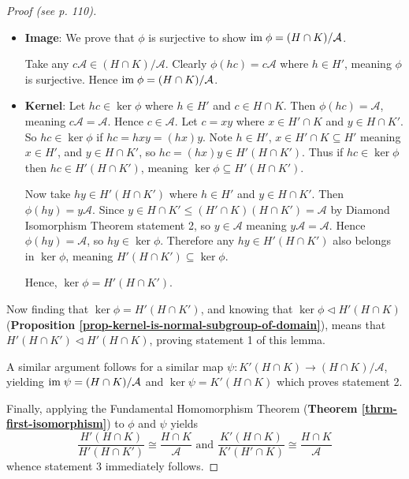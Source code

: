 \begin{proof}[Proof (see \cite{hungerford_1980} p. 110)]
\begin{itemize}
        \item \textbf{Image}: We prove that $\phi$ is surjective to show $\mathrm{im}\; \phi = (H\cap K)/\mathcal{A}$.
        
        Take any $c\mathcal{A} \in (H\cap K) / \mathcal{A}$. Clearly $\phi(hc) = c\mathcal{A}$ where $h \in H'$, meaning $\phi$ is surjective. Hence $\mathrm{im}\; \phi = (H\cap K)/\mathcal{A}$.
        
        \item \textbf{Kernel}: Let $hc \in \ker\phi$ where $h \in H'$ and $c \in H \cap K$. Then $\phi(hc) = \mathcal{A}$, meaning $c\mathcal{A} = \mathcal{A}$. Hence $c \in \mathcal{A}$. Let $c = xy$ where $x \in H'\cap K$ and $y \in H \cap K'$. So $hc \in \ker\phi$ if $hc = hxy = (hx)y$. Note $h \in H'$, $x \in H' \cap K \subseteq H'$ meaning $x \in H'$, and $y \in H \cap K'$, so $hc = (hx)y \in H'(H \cap K')$. Thus if $hc \in \ker\phi$ then $hc \in H'(H \cap K')$, meaning $\ker\phi \subseteq H'(H \cap K')$.
        
        Now take $hy \in H'(H \cap K')$ where $h \in H'$ and $y \in H \cap K'$. Then $\phi(hy) = y\mathcal{A}$. Since $y \in H \cap K' \leq (H' \cap K)(H \cap K') = \mathcal{A}$ by Diamond Isomorphism Theorem statement 2, so $y \in \mathcal{A}$ meaning $y\mathcal{A} = \mathcal{A}$. Hence $\phi(hy) = \mathcal{A}$, so $hy \in \ker\phi$. Therefore any $hy \in H'(H \cap K')$ also belongs in $\ker\phi$, meaning $H'(H \cap K') \subseteq \ker\phi$.
        
        Hence, $\ker\phi = H'(H \cap K')$.
    \end{itemize}
    
    Now finding that $\ker\phi = H'(H \cap K')$, and knowing that $\ker\phi \lhd H'(H\cap K)$ (\textbf{Proposition \ref{prop-kernel-is-normal-subgroup-of-domain}}), means that $H'(H \cap K') \lhd H'(H\cap K)$, proving statement 1 of this lemma.
    
    A similar argument follows for a similar map $\psi: K'(H\cap K) \to (H\cap K)/\mathcal{A}$, yielding $\mathrm{im}\;\psi = (H\cap K)/\mathcal{A}$ and $\ker\psi = K'(H\cap K)$ which proves statement 2.
    
    Finally, applying the Fundamental Homomorphism Theorem (\textbf{Theorem \ref{thrm-first-isomorphism}}) to $\phi$ and $\psi$ yields
    \[
        \frac{H'(H\cap K)}{H'(H\cap K')} \cong \frac{H\cap K}{\mathcal{A}} \text{ and } \frac{K'(H\cap K)}{K'(H'\cap K)} \cong \frac{H\cap K}{\mathcal{A}}
    \]
    whence statement 3 immediately follows.
\end{proof}

